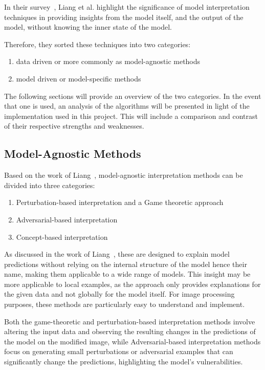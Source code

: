 In their survey~\cite{LIANG2021168}, Liang et al. highlight the significance of model interpretation techniques in providing insights from the model itself, and the output of the model, without knowing the inner state of the model.

Therefore, they sorted these techniques into two categories:
\begin{enumerate}
    \item data driven or more commonly as model-agnostic methods
    \item model driven or model-specific methods
\end{enumerate}

The following sections will provide an overview of the two categories.
In the event that one is used, an analysis of the algorithms will be presented in light of the implementation used in this project.
This will include a comparison and contrast of their respective strengths and weaknesses.



\subsection{Model-Agnostic Methods}\label{subsec:model-agnostic-methods}
Based on the work of  Liang~\cite{LIANG2021168}, model-agnostic interpretation methods can be divided into three categories:
\begin{enumerate}
    \item Perturbation-based interpretation and a Game theoretic approach
    \item Adversarial-based interpretation
    \item Concept-based interpretation
\end{enumerate}


As discussed in the work of Liang~\cite{LIANG2021168}, these are designed to explain model predictions without relying
on the internal structure of the model hence their name, making them applicable to a wide range of models.
This insight may be more applicable to local examples, as the approach only provides explanations for the given data and not globally for the model itself.
For image processing purposes, these methods are particularly easy to understand and implement.

Both the game-theoretic and perturbation-based interpretation methods involve altering the input data
and observing the resulting changes in the predictions of the model on the modified image, while Adversarial-based interpretation methods focus on generating small perturbations or adversarial examples that can significantly change the predictions, highlighting the model's vulnerabilities.


